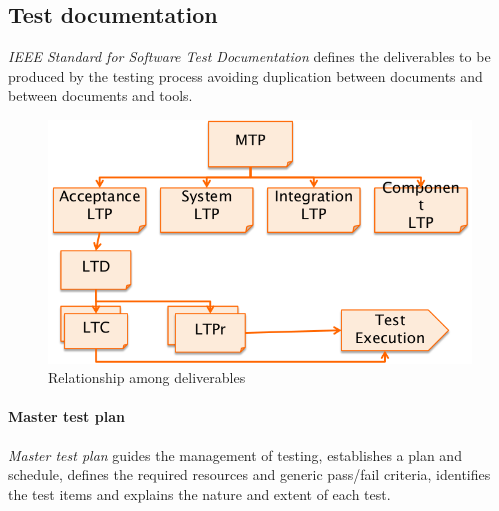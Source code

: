 \subsection{Test documentation}
\emph{IEEE Standard for Software Test Documentation} defines the deliverables to be produced by the testing process avoiding duplication between documents and between documents and tools.

\begin{figure}[hbtp]
\centering
\includegraphics[scale=0.3]{images/deliverables.png}
\caption{Relationship among deliverables}
\end{figure}

\begin{Parallel}{0.45\textwidth}{0.45\textwidth}
\end{Parallel}

\paragraph{Master test plan}
\emph{Master test plan} guides the management of testing, establishes a plan and schedule, defines the required resources and generic pass/fail criteria, identifies the test items and explains the nature and extent of each test.

